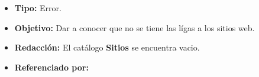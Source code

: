   
    \begin{itemize}
      \item \textbf{Tipo:} Error. 
      \item \textbf{Objetivo:}  Dar a conocer que no se tiene las lígas a los sitios web.
      \item \textbf{Redacción:} El catálogo \textbf{Sitios} se encuentra vacio.
      \item \textbf{Referenciado por:} \\
    \end{itemize}